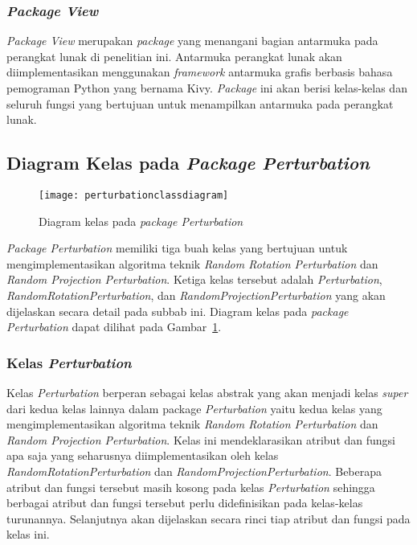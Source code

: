 \subsubsection{\textit{Package View}}
\label{subsubsec:package-view}

\textit{Package View} merupakan \textit{package} yang menangani bagian antarmuka pada perangkat lunak di penelitian ini. Antarmuka perangkat lunak akan diimplementasikan menggunakan \textit{framework} antarmuka grafis berbasis bahasa pemograman Python yang bernama Kivy. \textit{Package} ini akan berisi kelas-kelas dan seluruh fungsi yang bertujuan untuk menampilkan antarmuka pada perangkat lunak.

\subsection{Diagram Kelas pada \textit{Package Perturbation}}
\label{subsec:diagram-kelas-perturbation}

\begin{figure}
	\centering
	\texttt{[image: perturbationclassdiagram]}
	\caption{Diagram kelas pada \textit{package Perturbation}}
	\label{fig:perturbationclassdiagram}
\end{figure}

\textit{Package Perturbation} memiliki tiga buah kelas yang bertujuan untuk mengimplementasikan algoritma teknik \textit{Random Rotation Perturbation} dan \textit{Random Projection Perturbation}. Ketiga kelas tersebut adalah \textit{Perturbation}, \textit{RandomRotationPerturbation}, dan \textit{RandomProjectionPerturbation} yang akan dijelaskan secara detail pada subbab ini. Diagram kelas pada \textit{package Perturbation} dapat dilihat pada Gambar~\ref{fig:perturbationclassdiagram}.

\subsubsection{Kelas \textit{Perturbation}}
\label{subsubsec:kelas-perturbation}

Kelas \textit{Perturbation} berperan sebagai kelas abstrak yang akan menjadi kelas \textit{super} dari kedua kelas lainnya dalam package \textit{Perturbation} yaitu kedua kelas yang mengimplementasikan algoritma teknik \textit{Random Rotation Perturbation} dan \textit{Random Projection Perturbation}. Kelas ini mendeklarasikan atribut dan fungsi apa saja yang seharusnya diimplementasikan oleh kelas \textit{RandomRotationPerturbation} dan \textit{RandomProjectionPerturbation}. Beberapa atribut dan fungsi tersebut masih kosong pada kelas \textit{Perturbation} sehingga berbagai atribut dan fungsi tersebut perlu didefinisikan pada kelas-kelas turunannya. Selanjutnya akan dijelaskan secara rinci tiap atribut dan fungsi pada kelas ini.

